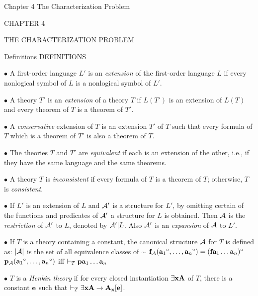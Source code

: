  {Chapter 4 The Characterization Problem}
\centerline{\xmplbxi CHAPTER 4}
\medskip
\centerline{\xmplbx THE CHARACTERIZATION PROBLEM}
\bigskip

 {Definitions}
\beginsection DEFINITIONS

\item{$\bullet$} A first-order language $L'$ is an {\it extension} of the first-order
language $L$ if every nonlogical symbol of $L$ is a nonlogical symbol of $L'$.

\item{$\bullet$} A theory $T'$ is an {\it extension} of a theory $T$ if $L(T')$ is
an extension of $L(T)$ and every theorem of $T$ is a theorem of $T'$.

\item{$\bullet$} A {\it conservative} extension of $T$ is an extension $T'$ of $T$
such that every formula of $T$ which is a theorem of $T'$ is also a theorem of $T$.

\item{$\bullet$} The theories $T$ and $T'$ are {\it equivalent} if each is an
extension of the other, i.e., if they have the same language and the same theorems.

\item{$\bullet$} A theory $T$ is {\it inconsistent} if every formula of $T$ is a
theorem of $T$; otherwise, $T$ is {\it consistent}.

\item{$\bullet$} If $L'$ is an extension of $L$ and ${\cal A}'$ is a structure for
$L'$, by omitting certain of the functions and predicates of ${\cal A}'$ a structure
for $L$ is obtained. Then ${\cal A}$ is the {\it restriction} of ${\cal A}'$ to $L$,
denoted by ${\cal A}' | L$. Also ${\cal A}'$ is an {\it expansion} of $\cal A$ to
$L'$.

\item{$\bullet$} If $T$ is a theory containing a constant, the canonical structure
${\cal A}$ for $T$ is defined as:
\itemitem{-} $|{\cal A}|$ is the set of all equivalence classes of $\sim$
\itemitem{-} ${\bf f}_{\cal A}({{\bf a}_1}^\circ, \dots, {{\bf a}_n}^\circ) = ({\bf f}{\bf a}_1\dots{\bf a}_n)^\circ$
\itemitem{-} ${\bf p}_{\cal A}({{\bf a}_1}^\circ, \dots, {{\bf a}_n}^\circ)$ iff $\vdash_T {\bf p}{\bf a}_1\dots{\bf a}_n$

\item{$\bullet$} $T$ is a {\it Henkin theory} if for every closed instantiation
$\exists{\bf x}{\bf A}$ of $T$, there is a constant ${\bf e}$ such that $\vdash_T \exists{\bf x}{\bf A} \to {\bf A}_{\bf x}[{\bf e}]$.


